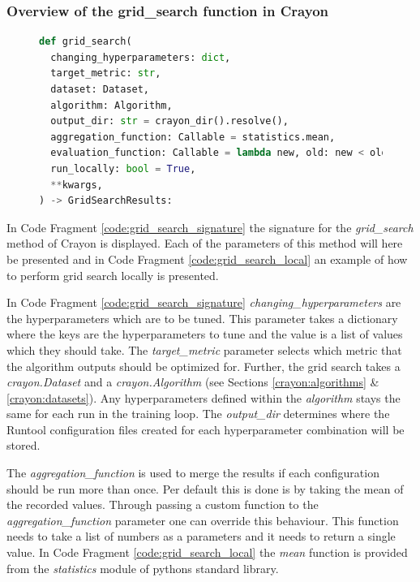 \subsubsection{Overview of the grid\_search function in Crayon}
\begin{figure}
  \begin{lstlisting}[language=Python, label={code:grid_search_signature}, caption={Parameters of the grid search functionality in Crayon.}]
def grid_search(
  changing_hyperparameters: dict,
  target_metric: str,
  dataset: Dataset,
  algorithm: Algorithm,
  output_dir: str = crayon_dir().resolve(),
  aggregation_function: Callable = statistics.mean,
  evaluation_function: Callable = lambda new, old: new < old,
  run_locally: bool = True,
  **kwargs,
) -> GridSearchResults:
    \end{lstlisting}
\end{figure}
In Code Fragment \ref{code:grid_search_signature} the signature for the \textit{grid\_search} method of Crayon is displayed. Each of the parameters of this method will here be presented and in Code Fragment \ref{code:grid_search_local} an example of how to perform grid search locally is presented.

In Code Fragment \ref{code:grid_search_signature} \textit{changing\_hyperparameters} are the hyperparameters which are to be tuned. This parameter takes a dictionary where the keys are the hyperparameters to tune and the value is a list of values which they should take. The \textit{target\_metric} parameter selects which metric that the algorithm outputs should be optimized for. Further, the grid search takes a \textit{crayon.Dataset} and a \textit{crayon.Algorithm} (see Sections \ref{crayon:algorithms} \& \ref{crayon:datasets}). Any hyperparameters defined within the \textit{algorithm} stays the same for each run in the training loop. The \textit{output\_dir} determines where the Runtool configuration files created for each hyperparameter combination will be stored.

The \textit{aggregation\_function} is used to merge the results if each configuration should be run more than once. Per default this is done is by taking the mean of the recorded values. Through passing a custom function to the \textit{aggregation\_function} parameter one can override this behaviour. This function needs to take a list of numbers as a parameters and it needs to return a single value. In Code Fragment \ref{code:grid_search_local} the \textit{mean} function is provided from the \textit{statistics} module of pythons standard library.

